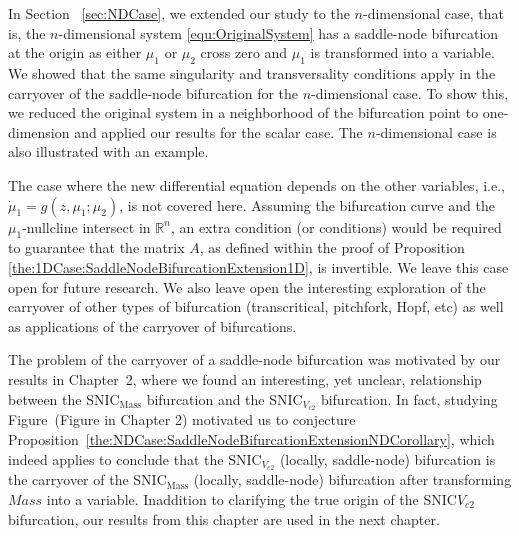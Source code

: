 \documentclass[12pt]{article}
\begin{document}
In Section ~\ref{sec:NDCase}, we extended our study to the $n$-dimensional case, that is, the $n$-dimensional system \eqref{equ:OriginalSystem} has a saddle-node bifurcation at the origin as either $\mu_{1}$ or $\mu_{2}$ cross zero and $\mu_{1}$ is transformed into a variable. We showed that the same singularity and transversality conditions apply in the carryover of the saddle-node bifurcation for the $n$-dimensional case. To show this, we reduced the original system in a neighborhood of the bifurcation point to one-dimension and applied our results for the scalar case. The $n$-dimensional case is also illustrated with an example.

The case where the new differential equation depends on the other variables, i.e., $\dot \mu_{1}=g(z,\mu_{1};\mu_{2})$, is not covered here. Assuming the bifurcation curve and the $\mu_{1}$-nullcline intersect in $\mathbb{R}^{n}$, an extra condition (or conditions) would be required to guarantee that the matrix $A$, as defined within the proof of Proposition \eqref{the:1DCase:SaddleNodeBifurcationExtension1D}, is invertible. We leave this case open for future research. We also leave open the interesting exploration of the carryover of other types of bifurcation (transcritical, pitchfork, Hopf, etc) as well as applications of the carryover of bifurcations.

The problem of the carryover of a saddle-node bifurcation was motivated by our results in Chapter~2, where we found an interesting, yet unclear, relationship between the SNIC$_{\text{Mass}}$ bifurcation and the SNIC$_{V_{c2}}$ bifurcation. In fact, studying Figure~(Figure in Chapter 2) motivated us to conjecture Proposition~\ref{the:NDCase:SaddleNodeBifurcationExtensionNDCorollary}, which indeed applies to conclude that the SNIC$_{V_{c2}}$ (locally, saddle-node) bifurcation is the carryover of the SNIC$_{\text{Mass}}$ (locally, saddle-node) bifurcation after transforming $Mass$ into a variable. Inaddition to clarifying the true origin of the SNIC$V_{c2}$ bifurcation, our results from this chapter are used in the next chapter.


% 
% 
% 
% 
% 

% 
% 
% 
% 
% 
% 
\end{document}
